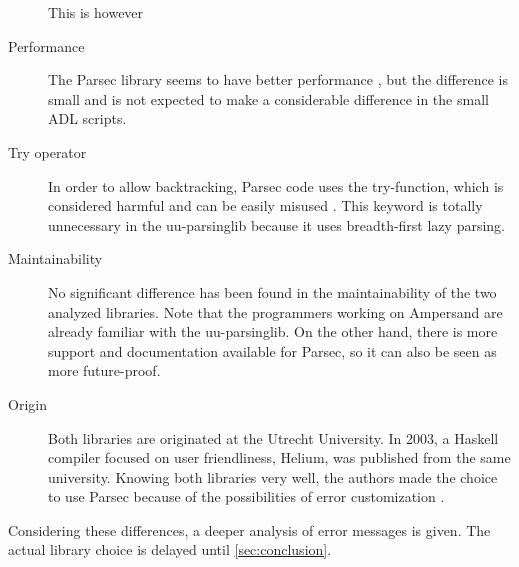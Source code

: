 \begin{description}
		This is however
	\item[Performance] The Parsec library seems to have better performance \cite{benchmark}, but the difference is small and is not expected to make a considerable difference in the small ADL scripts.
	\item[Try operator] In order to allow backtracking, Parsec code uses the try-function, which is considered harmful and can be easily misused \cite{try-harmful}.
		This keyword is totally unnecessary in the uu-parsinglib because it uses breadth-first lazy parsing.
	\item[Maintainability] No significant difference has been found in the maintainability of the two analyzed libraries.
		Note that the programmers working on Ampersand are already familiar with the uu-parsinglib.
		On the other hand, there is more support and documentation available for Parsec, so it can also be seen as more future-proof.
	\item[Origin] Both libraries are originated at the Utrecht University.
		In 2003, a Haskell compiler focused on user friendliness, Helium, was published from the same university.
		Knowing both libraries very well, the authors made the choice to use Parsec because of the possibilities of error customization \cite{helium-parser}.
\end{description}
%
Considering these differences, a deeper analysis of error messages is given.
The actual library choice is delayed until \autoref{sec:conclusion}.
